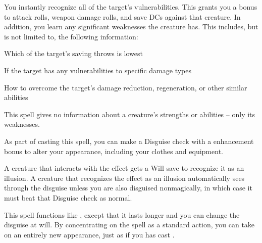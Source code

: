 \spellrng{\rngmed}
\begin{spelleffect}
  You instantly recognize all of the target's vulnerabilities. This grants you a  bonus to attack rolls, weapon damage rolls, and save DCs against that creature. In addition, you learn any significant weaknesses the creature has. This includes, but is not limited to, the following information:
  \begin{itemize*}
    \item Which of the target's saving throws is lowest
    \item If the target has any vulnerabilities to specific damage types
    \item How to overcome the target's damage reduction, regeneration, or other similar abilities
  \end{itemize*}
\end{spelleffect}
\begin{spellnotes}
  This spell gives no information about a creature's strengths or abilities -- only its weaknesses.
\end{spellnotes}

\spellrng{\rngpers}
\begin{spelleffect}
    As part of casting this spell, you can make a Disguise check with a  enhancement bonus to alter your appearance, including your clothes and equipment.
\end{spelleffect}
\begin{spellnotes}
  A creature that interacts with the effect gets a Will save to recognize it as an illusion. A creature that recognizes the effect as an illusion automatically sees through the disguise unless you are also disguised nonmagically, in which case it must beat that Disguise check as normal.
\end{spellnotes}

\begin{spelleffect}
  This spell functions like , except that it lasts longer and you can change the disguise at will. By concentrating on the spell as a standard action, you can take on an entirely new appearance, just as if you has cast . 
\end{spelleffect}

